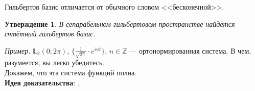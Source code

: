 \documentclass[12pt]{article}
\newcommand{\example}{{\itshape Пример. }}
\newtheorem{state}{Утверждение}[section] %
\begin{document}
	{\color{gray} Гильбертов базис отличается от обычного словом <<бесконечной>>.}
	
	\begin{state}
		В сепарабельном гильбертовом пространстве найдется счтётный гильбертов базис.
	\end{state}
	
	\example $\mathbb{L}_2 (0; 2\pi)$, $\{ \frac{1}{\sqrt{2\pi}} \cdot e^{int} \}$, $n \in \mathbb{Z}$ --- ортонормированная система.
	{\color{gray} В чем, разумеется, вы легко убедитесь.}\\
	Докажем, что эта система функций полна.\\
	\textbf{Идея доказательства}: .\\
\end{document}
